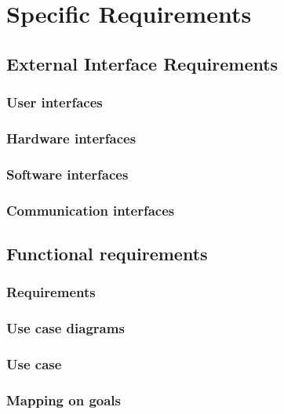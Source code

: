\section{Specific Requirements}

\subsection{External Interface Requirements}

\subsubsection{User interfaces}
\subsubsection{Hardware interfaces}
\subsubsection{Software interfaces}
\subsubsection{Communication interfaces}

\subsection{Functional requirements}

\subsubsection{Requirements}
\subsubsection{Use case diagrams}
\subsubsection{Use case}
\subsubsection{Mapping on goals}
